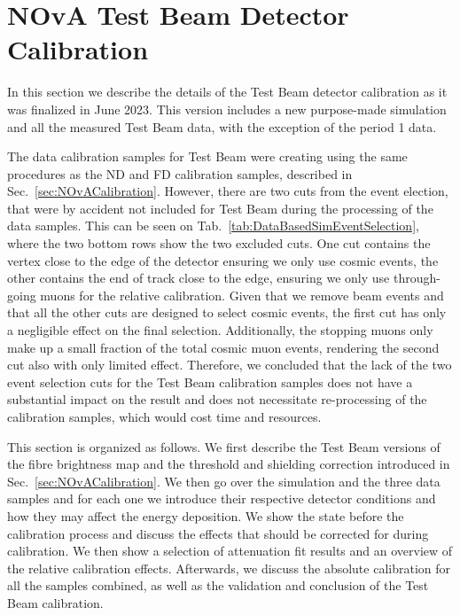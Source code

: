 
\section{NOvA Test Beam Detector Calibration}\label{sec:TBCalibrationSection}
In this section we describe the details of the Test Beam detector calibration as it was finalized in June 2023. This version includes a new purpose-made simulation and all the measured Test Beam data, with the exception of the period 1 data.

The data calibration samples for Test Beam were creating using the same procedures as the \gls{ND} and \gls{FD} calibration samples, described in Sec.~\ref{sec:NOvACalibration}. However, there are two cuts from the event election, that were by accident not included for Test Beam during the processing of the data samples. This can be seen on Tab.~\ref{tab:DataBasedSimEventSelection}, where the two bottom rows show the two excluded cuts. One cut contains the vertex close to the edge of the detector ensuring we only use cosmic events, the other contains the end of track close to the edge, ensuring we only use through-going muons for the relative calibration. Given that we remove beam events and that all the other cuts are designed to select cosmic events, the first cut has only a negligible effect on the final selection. Additionally, the stopping muons only make up a small fraction of the total cosmic muon events, rendering the second cut also with only limited effect. Therefore, we concluded that the lack of the two event selection cuts for the Test Beam calibration samples does not have a substantial impact on the result and does not necessitate re-processing of the calibration samples, which would cost time and resources.

This section is organized as follows. We first describe the Test Beam versions of the fibre brightness map and the threshold and shielding correction introduced in Sec.~\ref{sec:NOvACalibration}. We then go over the simulation and the three data samples and for each one we introduce their respective detector conditions and how they may affect the energy deposition. We show the state before the calibration process and discuss the effects that should be corrected for during calibration. We then show a selection of attenuation fit results and an overview of the relative calibration effects. Afterwards, we discuss the absolute calibration for all the samples combined, as well as the validation and conclusion of the Test Beam calibration.

